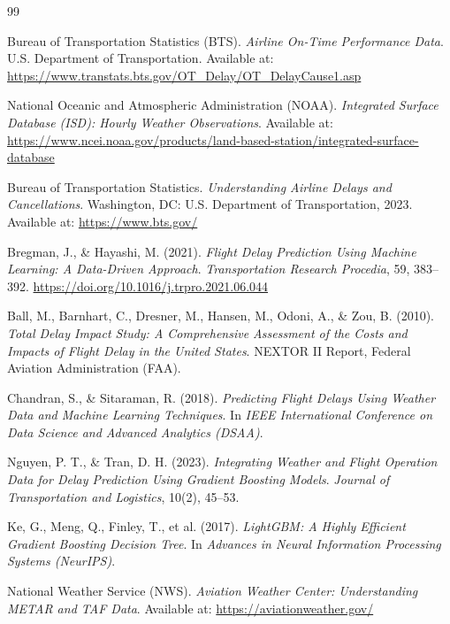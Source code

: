 \documentclass[a4paper,12pt]{report}
\begin{document}
\begin{thebibliography}{99}

Bureau of Transportation Statistics (BTS). \textit{Airline On-Time Performance Data}. U.S. Department of Transportation. Available at: \url{https://www.transtats.bts.gov/OT_Delay/OT_DelayCause1.asp}

National Oceanic and Atmospheric Administration (NOAA). \textit{Integrated Surface Database (ISD): Hourly Weather Observations}. Available at: \url{https://www.ncei.noaa.gov/products/land-based-station/integrated-surface-database}

Bureau of Transportation Statistics. \textit{Understanding Airline Delays and Cancellations}. Washington, DC: U.S. Department of Transportation, 2023. Available at: \url{https://www.bts.gov/}

Bregman, J., \& Hayashi, M. (2021). \textit{Flight Delay Prediction Using Machine Learning: A Data-Driven Approach}. \textit{Transportation Research Procedia}, 59, 383–392. \url{https://doi.org/10.1016/j.trpro.2021.06.044}

Ball, M., Barnhart, C., Dresner, M., Hansen, M., Odoni, A., \& Zou, B. (2010). \textit{Total Delay Impact Study: A Comprehensive Assessment of the Costs and Impacts of Flight Delay in the United States}. NEXTOR II Report, Federal Aviation Administration (FAA).

Chandran, S., \& Sitaraman, R. (2018). \textit{Predicting Flight Delays Using Weather Data and Machine Learning Techniques}. In \textit{IEEE International Conference on Data Science and Advanced Analytics (DSAA)}.

Nguyen, P. T., \& Tran, D. H. (2023). \textit{Integrating Weather and Flight Operation Data for Delay Prediction Using Gradient Boosting Models}. \textit{Journal of Transportation and Logistics}, 10(2), 45–53.


Ke, G., Meng, Q., Finley, T., et al. (2017). \textit{LightGBM: A Highly Efficient Gradient Boosting Decision Tree}. In \textit{Advances in Neural Information Processing Systems (NeurIPS)}.

National Weather Service (NWS). \textit{Aviation Weather Center: Understanding METAR and TAF Data}. Available at: \url{https://aviationweather.gov/}

\end{thebibliography}
\end{document}
